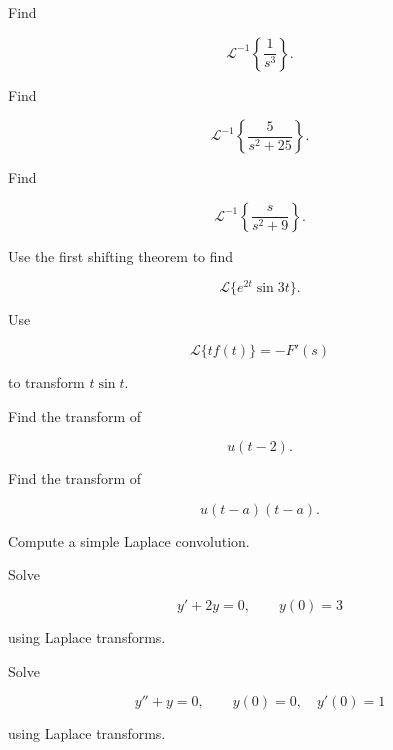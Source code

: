\begin{exercise}[2]
Find

\[
\mathcal{L}^{-1}
\left\{
\frac1{s^3}
\right\}.
\]
\end{exercise}

\begin{exercise}[2]
Find

\[
\mathcal{L}^{-1}
\left\{
\frac{5}{s^2+25}
\right\}.
\]
\end{exercise}

\begin{exercise}[2]
Find

\[
\mathcal{L}^{-1}
\left\{
\frac{s}{s^2+9}
\right\}.
\]
\end{exercise}

\begin{exercise}[2]
Use the first shifting theorem to find

\[
\mathcal{L}\{e^{2t}\sin3t\}.
\]
\end{exercise}

\begin{exercise}[2]
Use

\[
\mathcal{L}\{tf(t)\}
=
-F'(s)
\]

to transform \(t\sin t\).
\end{exercise}

\begin{exercise}[2]
Find the transform of

\[
u(t-2).
\]
\end{exercise}

\begin{exercise}[2]
Find the transform of

\[
u(t-a)(t-a).
\]
\end{exercise}

\begin{exercise}[2]
Compute a simple Laplace convolution.
\end{exercise}

\begin{exercise}[3]
Solve

\[
y'+2y=0,
\qquad
y(0)=3
\]

using Laplace transforms.
\end{exercise}

\begin{exercise}[3]
Solve

\[
y''+y=0,
\qquad
y(0)=0,
\quad
y'(0)=1
\]

using Laplace transforms.
\end{exercise}

